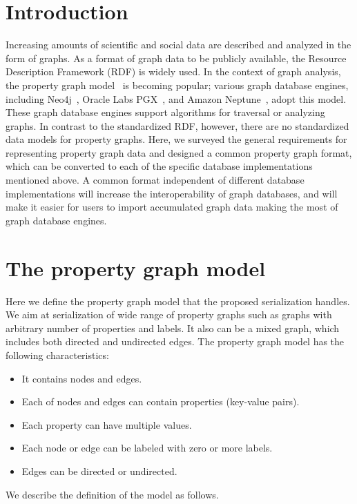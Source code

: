 \documentclass[runningheads]{llncs}
\begin{document}
\section{Introduction}
Increasing amounts of scientific and social data are described and analyzed in the form of graphs.
As a format of graph data to be publicly available, the Resource Description Framework (RDF) is widely used. 
In the context of graph analysis, the property graph model~\cite{angles} is becoming popular; various graph database engines, including Neo4j~\cite{neo4j}, Oracle Labs PGX~\cite{pgx}, and Amazon Neptune~\cite{neptune}, adopt this model. These graph database engines support algorithms for traversal or analyzing graphs. 
In contrast to the standardized RDF, however, there are no standardized data models for property graphs.
Here, we surveyed the general requirements for representing property graph data and designed a common property graph format, which can be converted to each of the specific database implementations mentioned above. A common format independent of different database implementations will increase the interoperability of graph databases, and will make it easier for users to import accumulated graph data making the most of graph database engines.


\section{The property graph model}
Here we define the property graph model that the proposed serialization handles.
We aim at serialization of wide range of property graphs such as graphs with arbitrary number of properties and labels. It also can be a mixed graph, which includes both directed and undirected edges. The property graph model has the following characteristics:

\begin{itemize}
    \item It contains nodes and edges.
    \item Each of nodes and edges can contain properties (key-value pairs).
    \item Each property can have multiple values.
    \item Each node or edge can be labeled with zero or more labels.
    \item Edges can be directed or undirected.
\end{itemize}
We describe the definition of the model as follows.
\end{document}
